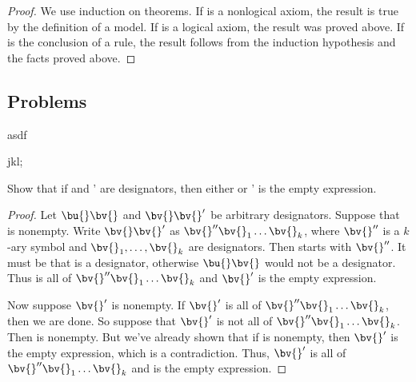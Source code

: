 \begin{proof}
    We use induction on theorems.
    If \A{} is a nonlogical axiom, the result is true by the definition of a model.
    If \A{} is a logical axiom, the result was proved above.
    If \A{} is the conclusion of a rule, the result follows from the induction hypothesis and the facts proved above.
\end{proof}


\subsection{Problems}

\begin{exercise}
    asdf
\end{exercise}

\begin{exercise}
    jkl;
\end{exercise}

\begin{exercise}
    Show that if \bu{}\bv{} and \bv{}\bv{}' are designators, then either \bv{} or \bv{}' is the empty expression.
\end{exercise}

\begin{proof}
    Let $\bu{} \bv{}$ and $\bv{} \bv{}'$ be arbitrary designators.
    Suppose that \bv{} is nonempty.
    Write $\bv{}\bv{}'$ as $\bv{}'' \bv{}_1 \dots \bv{}_k$, where $\bv{}''$ is a $k$-ary symbol and $\bv{}_1, \dots, \bv{}_k$ are designators.
    Then \bv{} starts with $\bv{}''$.
    It must be that \bv{} is a designator, otherwise $\bu{} \bv{}$ would not be a designator.
    Thus \bv{} is all of $\bv{}'' \bv{}_1 \dots \bv{}_k$ and $\bv{}'$ is the empty expression.
    
    Now suppose $\bv{}'$ is nonempty.
    If $\bv{}'$ is all of $\bv{}'' \bv{}_1 \dots \bv{}_k$, then we are done.
    So suppose that $\bv{}'$ is not all of $\bv{}'' \bv{}_1 \dots \bv{}_k$.
    Then \bv{} is nonempty.
    But we've already shown that if \bv{} is nonempty, then $\bv{}'$ is the empty expression, which is a contradiction.
    Thus, $\bv{}'$ is all of $\bv{}'' \bv{}_1 \dots \bv{}_k$ and \bv{} is the empty expression.
\end{proof}
